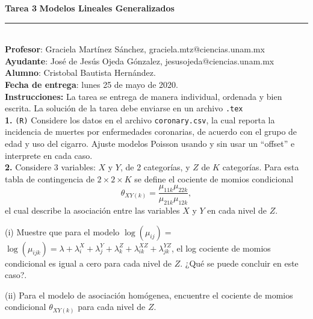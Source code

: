 \documentclass[12pt,a4paper,oneside]{article}
\begin{document}
\noindent \textbf{Tarea 3} \hfill\textbf{Modelos Lineales Generalizados} \\[-2ex]
\rule{\textwidth}{0.5pt}\\

	
\noindent 	\textbf{Profesor}: Graciela Martínez Sánchez, graciela.mtz@ciencias.unam.mx\\
\textbf{Ayudante}: José de Jesús Ojeda Gónzalez, jesusojeda@ciencias.unam.mx\\
\textbf{Alumno}: Cristobal Bautista Hernández.\\
\textbf{Fecha de entrega}: lunes 25 de mayo de 2020.\\[2ex]
\noindent \textbf{Instrucciones:} La tarea se entrega de manera individual, ordenada y bien escrita.  La solución de la tarea debe enviarse en un archivo \texttt{.tex}\\


\noindent \textbf{1. } \texttt{(R)} Considere los datos en el archivo \texttt{coronary.csv}, la cual reporta la incidencia de muertes por enfermedades coronarias,  de acuerdo con el grupo de edad y uso del cigarro. Ajuste modelos Poisson  usando y sin usar un “offset” e interprete en cada caso.\\

\noindent \textbf{2. } Considere 3 variables: $X$ y $Y$, de 2 categorías, y $Z$ de $K$ categorías. Para esta tabla de contingencia de  $2\times 2\times K$ se define el cociente de momios condicional  $$\theta_{XY(k)} = \dfrac{\mu_{11k} \mu_{22k}}{\mu_{21k}\mu_{12k}},$$ el cual describe la asociación entre  las variables $X$ y $Y$ en cada nivel de $Z$. \\

\begin{compactenum}
	\item[(i)] Muestre que para el modelo $\log(\mu_{ij}) =  $ $\log(\mu_{ijk}) = \lambda + \lambda_i^X + \lambda_j^Y + \lambda_k^Z + \lambda_{ik}^{XZ} + \lambda_{jk}^{YZ}$, el log cociente de momios condicional es igual a cero para cada nivel de $Z$. ¿Qué se puede concluir en este caso?.	
	\item[(ii)] Para el modelo de asociación homógenea, encuentre el cociente de momios condicional  $\theta_{XY(k)}$ para cada nivel de $Z$.
\end{compactenum}
	
\end{document}
